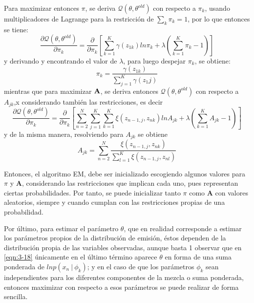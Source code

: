 Para maximizar entonces $\pi$, se deriva $\mathcal{Q}(\theta, \theta^{old})$ con respecto a $\pi_k$,
usando multiplicadores de Lagrange para la restricción de $\sum_k \pi_k = 1$, por lo que entonces se tiene: 
\begin{equation*}
\frac {\partial \mathcal{Q}(\theta, \theta^{old})}{\partial \pi_k} = 
\frac {\partial}{\partial \pi_k} \left[
\sum_{k=1}^K \gamma(z_{1k}) ln \pi_k + \lambda (\sum_{k=1}^K \pi_k - 1) 
\right]
\end{equation*}
y derivando y encontrando el valor de $\lambda$, para luego despejar $\pi_k$, se obtiene:
\begin{equation}
\pi_k = \frac{\gamma(z_{1k})}{\sum_{j=1}^K \gamma(z_1j)}
\label{eqn:3-19}
\end{equation}
mientras que para maximizar $\textbf{A}$, se deriva entonces $\mathcal{Q}(\theta, \theta^{old})$ con respecto a $A_{jk}$,x
considerando también las restricciones, es decir
\begin{equation*}
\frac {\partial \mathcal{Q}(\theta, \theta^{old})}{\partial \pi_k} = 
\frac {\partial}{\partial \pi_k} \left[
\sum_{n=2}^N \sum_{j=1}^K \sum_{k=1}^K \xi(z_{n-1,j}, z_{nk}) ln A_{jk} 
+ \lambda (\sum_{k=1}^K A_{jk} - 1) 
\right]
\end{equation*}
y de la misma manera, resolviendo para $A_{jk}$ se obtiene
\begin{equation}
A_{jk} = \sum_{n=2}^N \frac{\xi(z_{n-1,j}, z_{nk})}{ \sum_{l=1}^K \xi(z_{n-1,j}, z_{nl})}
\label{eqn:3-20}
\end{equation}

Entonces, el algoritmo EM, debe ser inicializado escogiendo algunos valores para $\pi$ y $\mathbf{A}$, 
considerando las restricciones que implican cada uno, pues representan ciertas probabilidades. Por tanto, 
se puede inicializar tanto $\pi$ como $\mathbf{A}$ con valores aleatorios, siempre y cuando cumplan con 
las restricciones propias de una probabilidad. 

Por último, para estimar el parámetro $\theta$, que en realidad corresponde a estimar los parámetros propios 
de la distribución de emisión, éstos dependen de la distribución propia de las variables observadas, aunque basta 1
observar que en \eqref{eqn:3-18} únicamente en el último término aparece $\theta$ en forma de una suma 
ponderada de $ln p(x_n ~|~  \phi_k)$; y en el caso de que los parámetros $\phi_k$ sean independientes para los 
diferentes componentes de la mezcla o suma ponderada, entonces maximizar con respecto a esos parámetros se puede 
realizar de forma sencilla.

